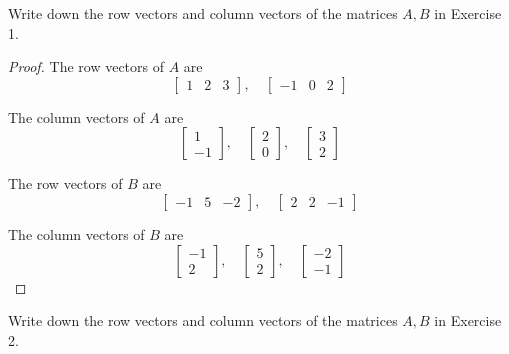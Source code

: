 \begin{exercise}
    Write down the row vectors and column vectors of the matrices $A, B$ in Exercise 1.
\end{exercise}

\begin{proof}
    The row vectors of $A$ are
    \[
        \begin{bmatrix}
            1 & 2 & 3
        \end{bmatrix},\quad
        \begin{bmatrix}
            -1 & 0 & 2
        \end{bmatrix}
    \]

    The column vectors of $A$ are
    \[
        \begin{bmatrix}
            1 \\
            -1
        \end{bmatrix},\quad
        \begin{bmatrix}
            2 \\
            0
        \end{bmatrix},\quad
        \begin{bmatrix}
            3 \\
            2
        \end{bmatrix}
    \]

    The row vectors of $B$ are
    \[
        \begin{bmatrix}
            -1 & 5 & -2
        \end{bmatrix},\quad
        \begin{bmatrix}
            2 & 2 & -1
        \end{bmatrix}
    \]

    The column vectors of $B$ are
    \[
        \begin{bmatrix}
            -1 \\
            2
        \end{bmatrix},\quad
        \begin{bmatrix}
            5 \\
            2
        \end{bmatrix},\quad
        \begin{bmatrix}
            -2 \\
            -1
        \end{bmatrix}
    \]
\end{proof}

\begin{exercise}
    Write down the row vectors and column vectors of the matrices $A, B$ in Exercise 2.
\end{exercise}

